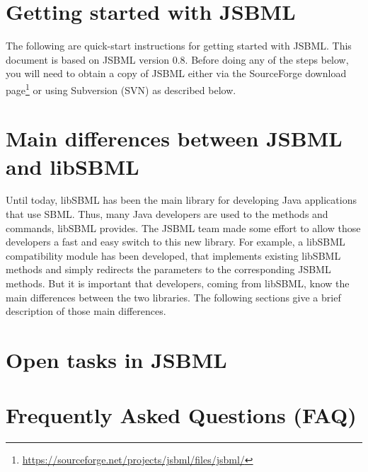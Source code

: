 \documentclass[
  BCOR12mm,
  letterpaper,
  11pt,
  headsepline,
  pointlessnumbers,
  tablecaptionabove,
  onelinecaption,
  headinclude,
  appendixprefix,
  idxtotoc,
  bibtotoc,
  twoside,
  titlepage
]{scrreprt}
\begin{document}
\tableofcontents

\chapter{Getting started with JSBML}

The following are quick-start instructions for getting started with JSBML. This
document is based on JSBML version 0.8. Before doing any of the steps below,
you will need to obtain a copy of JSBML either via the SourceForge download
page\footnote{\url{https://sourceforge.net/projects/jsbml/files/jsbml/}} or using
Subversion (SVN) as described below.





\chapter{Main differences between JSBML and libSBML}

Until today, libSBML has been the main library for developing Java applications
that use SBML. Thus, many Java developers are used to the methods and commands,
libSBML provides. The JSBML team made some effort to allow those developers a
fast and easy switch to this new library. For example, a libSBML compatibility
module has been developed, that implements existing libSBML methods and simply
redirects the parameters to the corresponding JSBML methods. But it is important
that developers, coming from libSBML, know the main differences between the two
libraries. The following sections give a brief description of those main
differences.



\chapter{Open tasks in JSBML}



\appendix

\chapter{Frequently Asked Questions (FAQ)}







\printindex
\end{document}
